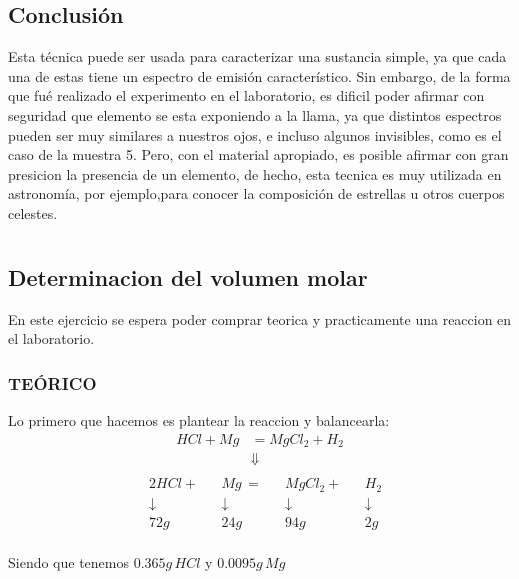 \documentclass[12pt]{report}
\begin{document}
\section{Conclusión}

Esta técnica puede ser usada para caracterizar una sustancia simple, ya que cada una de estas tiene
un espectro de emisión característico. Sin embargo, de la forma que fué realizado el experimento en
el laboratorio, es dificil poder afirmar con seguridad que elemento se esta exponiendo a la llama,
ya que distintos espectros pueden ser muy similares a nuestros ojos, e incluso algunos invisibles,
como es el caso de la muestra 5. Pero, con el material apropiado, es posible afirmar con
gran presicion la presencia de un elemento, de hecho, esta tecnica es muy utilizada en astronomía,
por ejemplo,para conocer la composición de estrellas u otros cuerpos celestes.

\chapter{}
\section{Determinacion del volumen molar}

En este ejercicio se espera poder comprar teorica y practicamente una reaccion en el laboratorio.\\

\subsection{TEÓRICO}

Lo primero que hacemos es plantear la reaccion y balancearla:\\
$$
\begin{aligned}
    HCl + Mg &= MgCl_2 + H_2\\[6pt]
    &\Downarrow\\[6pt]
\end{aligned}
$$
$$
\begin{aligned}
    &2HCl + &&Mg \, = &&MgCl_2 + &&H_2 \\[6pt]
    &\downarrow &&\downarrow &&\downarrow &&\downarrow \\
    &72g &&24g &&94g &&2g \\[12pt]
\end{aligned}
$$

Siendo que tenemos $0.365g \, HCl$ y $0.0095g \, Mg$\\
\end{document}

